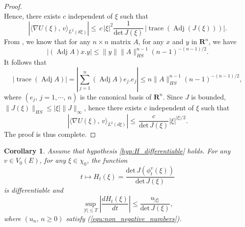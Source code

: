 \documentclass[11pt,a4paper]{amsart}
\newtheorem{Corollary}{Corollary}
\begin{document}
\begin{proof}
\begin{equation*}
  \end{equation*}
  Hence, there exists $c$ independent of $\xi$ such that
  \begin{equation*}
    \left| \langle \nabla U(\xi),\, v\rangle_{L^2(d\xi)}\right|\le \, c\, |\xi|^{2}\frac{1}{{{\text{det}}} \, J(\xi)} \,
    |{\operatorname{trace}}( {\operatorname{Adj}}  (J(\xi)) )|.
  \end{equation*}
  From \cite[page 1021]{0635.47002}, we know that for any $n\times n$
  matrix $A$, for any $x$ and $y$ in ${{\mathbf R}}^{n}$, we have
  \begin{equation*}
    |({\operatorname{Adj}} A) x.y|\le \|y\|\|A\|_{HS}^{n-1}(n-1)^{-(n-1)/2}.
  \end{equation*}
  It follows that
  \begin{equation*}
    |{\operatorname{trace}}({\operatorname{Adj}} A)|=|\sum_{j=1}^n ({\operatorname{Adj}} A) e_j.e_j|\le n \|A\|_{HS}^{n-1}(n-1)^{-(n-1)/2},
  \end{equation*}
  where $(e_j,\, j=1,\cdots,\, n)$ is the canonical basis of
  ${{\mathbf R}}^n$. Since $J$ is bounded, $\|J(\xi)\|_{HS}\le
  |\xi|\|J\|_\infty$, hence there exists $c$ independent of $\xi$ such
  that
  \begin{equation*}
    \left| \langle \nabla U(\xi),\, v\rangle_{L^2(d\xi)}\right|\le \, \frac{c}{{{\text{det}}} \, J(\xi)} 
    |\xi|^{|\xi|/2}.
  \end{equation*}
  The proof is thus complete.
\end{proof}
\begin{Corollary}
  \label{lem:borne_sur_H}
  Assume that hypothesis \ref{hyp:H_differentiable} holds. For any
  $v\in V_0(E)$, for any $\xi\in \chi_0$, the function
  \begin{equation*}
    t\longmapsto  H_t(\xi)=\frac{{{\text{det}}}\,  J(\phi_t^v(\xi))}{{{\text{det}}} \, J(\xi)}
  \end{equation*}
  is differentiable and
  \begin{equation*}
    \sup_{|t|\le T} \left| \frac{d H_t(\xi)}{dt}\right|\le \frac{ u_{|\xi|}}{{{\text{det}}}\, J(\xi)},
  \end{equation*}
  where $(u_n,\,  n\ge 0)$ satisfy (\ref{equ:non_negative_numbers}).
\end{Corollary}
\end{document}

